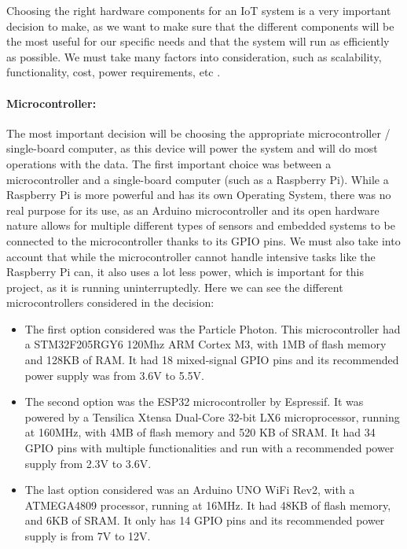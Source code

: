 \documentclass[12pt]{article}
\begin{document}
Choosing the right hardware components for an IoT system is a very important decision to make, as we want to make sure that the different components will be the most useful for our specific needs and that the system will run as efficiently as possible. We must take many factors into consideration, such as scalability, functionality, cost, power requirements, etc \cite{digiteum}.\par

\paragraph*{Microcontroller:}
The most important decision will be choosing the appropriate microcontroller / single-board computer, as this device will power the system and will do most operations with the data. The first important choice was between a microcontroller and a single-board computer (such as a Raspberry Pi). While a Raspberry Pi is more powerful and has its own Operating System, there was no real purpose for its use, as an Arduino microcontroller and its open hardware nature allows for multiple different types of sensors and embedded systems to be connected to the microcontroller thanks to its GPIO pins. We must also take into account that while the microcontroller cannot handle intensive tasks like the Raspberry Pi can, it also uses a lot less power, which is important for this project, as it is running uninterruptedly. Here we can see the different microcontrollers considered in the decision:

\begin{itemize}
    \item The first option considered was the Particle Photon. This microcontroller had a STM32F205RGY6 120Mhz ARM Cortex M3, with 1MB of flash memory and 128KB of RAM. It had 18 mixed-signal GPIO pins and its recommended power supply was from 3.6V to 5.5V.
    \item The second option was the ESP32 microcontroller by Espressif. It was powered by a Tensilica Xtensa Dual-Core 32-bit LX6 microprocessor, running at 160MHz, with 4MB of flash memory and 520 KB of SRAM. It had 34 GPIO pins with multiple functionalities and run with a recommended power supply from 2.3V to 3.6V.
    \item The last option considered was an Arduino UNO WiFi Rev2, with a ATMEGA4809 processor, running at 16MHz. It had 48KB of flash memory, and 6KB of SRAM. It only has 14 GPIO pins and its recommended power supply is from 7V to 12V. 
\end{itemize}
\end{document}
